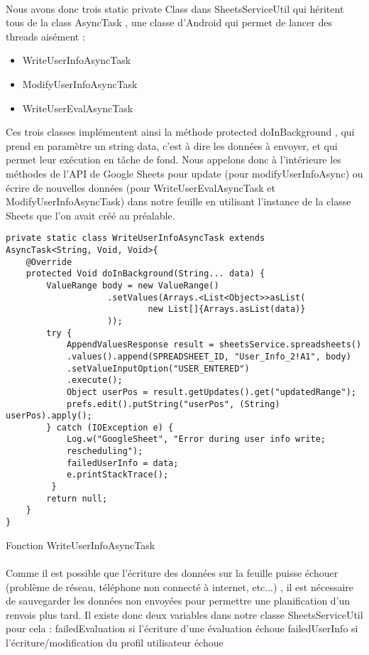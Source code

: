 \documentclass[../main.tex]{subfiles}
\begin{document}
\paragraph{}
Nous avons donc trois static private Class dans SheetsServiceUtil qui héritent tous de la class AsyncTask , une classe d’Android qui permet de lancer des threads aisément : 
 \begin{itemize}
\item WriteUserInfoAsyncTask
\item ModifyUserInfoAsyncTask
\item WriteUserEvalAsyncTask
\end{itemize}
Ces trois classes implémentent ainsi la méthode protected doInBackground , qui prend en paramètre un string data, c’est à dire les données à envoyer, et qui permet leur exécution en tâche de fond.
Nous appelons donc à l'intérieure les méthodes de l’API de Google Sheets pour update (pour modifyUserInfoAsync) 
ou écrire de nouvelles données (pour WriteUserEvalAsyncTask et ModifyUserInfoAsyncTask) dans notre feuille en utilisant l’instance de la classe Sheets que l’on avait créé au préalable.
\hfill \break 
\begin{lstlisting}[tabsize=3]
private static class WriteUserInfoAsyncTask extends 
AsyncTask<String, Void, Void>{
	@Override
	protected Void doInBackground(String... data) {
		ValueRange body = new ValueRange()
                    .setValues(Arrays.<List<Object>>asList(
                            new List[]{Arrays.asList(data)}
                    ));
		try {
			AppendValuesResponse result = sheetsService.spreadsheets()
			.values().append(SPREADSHEET_ID, "User_Info_2!A1", body)
			.setValueInputOption("USER_ENTERED")
			.execute();
			Object userPos = result.getUpdates().get("updatedRange");
			prefs.edit().putString("userPos", (String) userPos).apply();
		} catch (IOException e) {
			Log.w("GoogleSheet", "Error during user info write; 
			rescheduling");
			failedUserInfo = data;
			e.printStackTrace();
		 }
		return null;
	}
}
\end{lstlisting}
Fonction WriteUserInfoAsyncTask
\paragraph{}
Comme il est possible que l’écriture des données sur la feuille puisse échouer (problème de réseau, téléphone non connecté à internet, etc...) , il est nécessaire de sauvegarder les données non envoyées pour permettre une planification d’un renvois plus tard. Il existe donc deux variables dans notre classe SheetsServiceUtil pour cela : 
failedEvaluation si l’écriture d’une évaluation échoue
failedUserInfo si l’écriture/modification du profil utilisateur échoue
\end{document}
